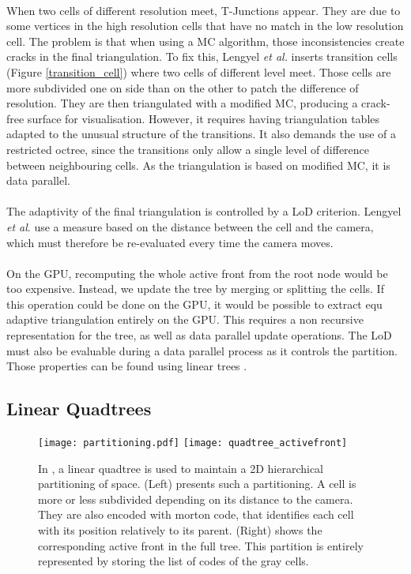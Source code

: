 \paragraph{}
When two cells of different resolution meet, T-Junctions appear.
They are due to some vertices in the high resolution cells that have no match in the low resolution cell.
The problem is that when using a MC algorithm, those inconsistencies create cracks in the final triangulation.
To fix this, Lengyel \textit{et al.} inserts transition cells (Figure \ref{transition_cell}) where two cells of different level meet.
Those cells are more subdivided one on side than on the other to patch the difference of resolution.
They are then triangulated with a modified MC, producing a crack-free surface for visualisation.
However, it requires having triangulation tables adapted to the unusual structure of the transitions.
It also demands the use of a restricted octree, since the transitions only allow a single level of difference between neighbouring cells.
As the triangulation is based on modified MC, it is data parallel.

\paragraph{}
The adaptivity of the final triangulation is controlled by a LoD criterion.
Lengyel \textit{et al}. use a measure based on the distance between the cell and the camera, which must therefore be re-evaluated every time the camera moves.

\paragraph{}
On the GPU, recomputing the whole active front from the root node would be too expensive.
Instead, we update the tree by merging or splitting the cells.
If this operation could be done on the GPU, it would be possible to extract equ adaptive triangulation entirely on the GPU.
This requires a non recursive representation for the tree, as well as data parallel update operations.
The LoD must also be evaluable during a data parallel process as it controls the partition.
Those properties can be found using linear trees \cite{dupuy2014quadtrees}.


\subsection{Linear Quadtrees}

\begin{figure}
\centering
\texttt{[image: partitioning.pdf]}
\hfill
\texttt{[image: quadtree\_activefront]}
\caption{In \cite{dupuy2014quadtrees}, a linear quadtree is used to maintain a 2D hierarchical partitioning of space.
(Left) presents such a partitioning.
A cell is more or less subdivided depending on its distance to the camera.
They are also encoded with morton code, that identifies each cell with its position relatively to its parent.
(Right) shows the corresponding active front in the full tree.
This partition is entirely represented by storing the list of codes of the gray cells. }
\label{fig_quadtree_partitionning}
\end{figure}


